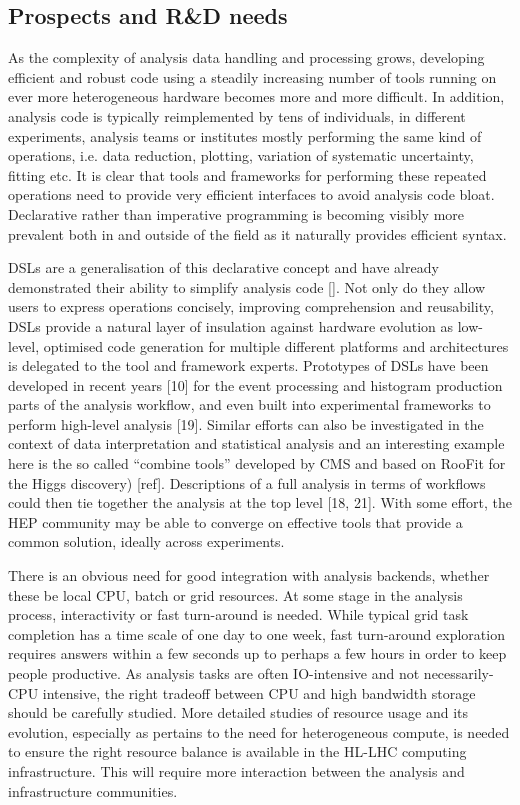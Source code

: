 \documentclass[10pt,a4paper]{article}
\begin{document}
\hypertarget{prospects-and-rd-needs}{%
\subsection{Prospects and R\&D needs}\label{prospects-and-rd-needs}}

As the complexity of analysis data handling and processing grows,
developing efficient and robust code using a steadily increasing number
of tools running on ever more heterogeneous hardware becomes more and
more difficult. In addition, analysis code is typically reimplemented by
tens of individuals, in different experiments, analysis teams or
institutes mostly performing the same kind of operations, i.e. data
reduction, plotting, variation of systematic uncertainty, fitting etc.
It is clear that tools and frameworks for performing these repeated
operations need to provide very efficient interfaces to avoid analysis
code bloat. Declarative rather than imperative programming is becoming
visibly more prevalent both in and outside of the field as it naturally
provides efficient syntax.

DSLs are a generalisation of this declarative concept and have already
demonstrated their ability to simplify analysis code {[}{]}. Not only do
they allow users to express operations concisely, improving
comprehension and reusability, DSLs provide a natural layer of
insulation against hardware evolution as low-level, optimised code
generation for multiple different platforms and architectures is
delegated to the tool and framework experts. Prototypes of DSLs have
been developed in recent years {[}10{]} for the event processing and
histogram production parts of the analysis workflow, and even built into
experimental frameworks to perform high-level analysis {[}19{]}. Similar
efforts can also be investigated in the context of data interpretation
and statistical analysis and an interesting example here is the so
called ``combine tools'' developed by CMS and based on RooFit for the
Higgs discovery) {[}ref{]}. Descriptions of a full analysis in terms of
workflows could then tie together the analysis at the top level {[}18,
21{]}. With some effort, the HEP community may be able to converge on
effective tools that provide a common solution, ideally across
experiments.

There is an obvious need for good integration with analysis backends,
whether these be local CPU, batch or grid resources. At some stage in
the analysis process, interactivity or fast turn-around is needed. While
typical grid task completion has a time scale of one day to one week,
fast turn-around exploration requires answers within a few seconds up to
perhaps a few hours in order to keep people productive. As analysis
tasks are often IO-intensive and not necessarily-CPU intensive, the
right tradeoff between CPU and high bandwidth storage should be
carefully studied. More detailed studies of resource usage and its
evolution, especially as pertains to the need for heterogeneous compute,
is needed to ensure the right resource balance is available in the
HL-LHC computing infrastructure. This will require more interaction
between the analysis and infrastructure communities.
\end{document}
